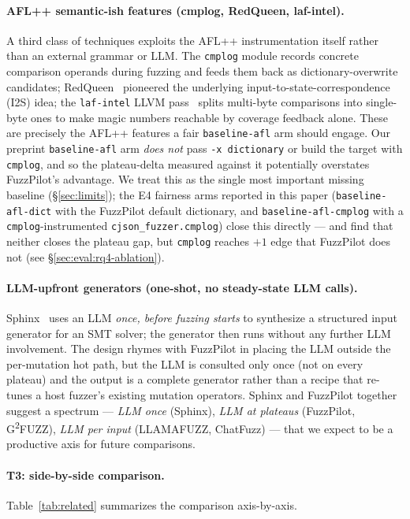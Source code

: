 \documentclass[11pt]{article}
\begin{document}
\paragraph{AFL++ semantic-ish features (cmplog, RedQueen,
laf-intel).}
A third class of techniques exploits the AFL++ instrumentation
itself rather than an external grammar or LLM. The
\texttt{cmplog} module records concrete comparison operands
during fuzzing and feeds them back as
dictionary-overwrite candidates;
RedQueen~\cite{aschermann2019redqueen} pioneered the underlying
input-to-state-correspondence (I2S) idea; the \texttt{laf-intel}
LLVM pass~\cite{lafintel2016} splits multi-byte comparisons into
single-byte ones to make magic numbers reachable by coverage
feedback alone. These are precisely the AFL++ features a fair
\texttt{baseline-afl} arm should engage. Our preprint
\texttt{baseline-afl} arm \emph{does not} pass
\texttt{-x dictionary} or build the target with
\texttt{cmplog}, and so the plateau-delta measured against it
potentially overstates FuzzPilot's advantage. We treat this as the
single most important missing baseline (\S\ref{sec:limits}); the
E4 fairness arms reported in this paper
(\texttt{baseline-afl-dict} with the FuzzPilot default
dictionary, and \texttt{baseline-afl-cmplog} with a
\texttt{cmplog}-instrumented \texttt{cjson\_fuzzer.cmplog})
close this directly --- and find that neither closes the plateau
gap, but \texttt{cmplog} reaches $+1$ edge that FuzzPilot does
not (see \S\ref{sec:eval:rq4-ablation}).

\paragraph{LLM-upfront generators (one-shot, no steady-state
LLM calls).}
Sphinx~\cite{sun2024sphinx} uses an LLM \emph{once, before
fuzzing starts} to synthesize a structured input generator for
an SMT solver; the generator then runs without any further LLM
involvement. The design rhymes with FuzzPilot in placing the LLM
outside the per-mutation hot path, but the LLM is consulted only
once (not on every plateau) and the output is a complete
generator rather than a recipe that re-tunes a host fuzzer's
existing mutation operators. Sphinx and FuzzPilot together
suggest a spectrum --- \emph{LLM once} (Sphinx), \emph{LLM at
plateaus} (FuzzPilot, G\textsuperscript{2}FUZZ), \emph{LLM per
input} (LLAMAFUZZ, ChatFuzz) --- that we expect to be a
productive axis for future comparisons.

\paragraph{T3: side-by-side comparison.}
Table~\ref{tab:related} summarizes the comparison axis-by-axis.
\end{document}
